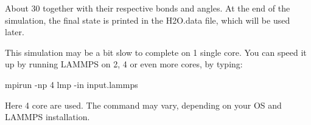 \noindent About 30 %
together with their respective bonds and angles.
At the end of the simulation, the final state is printed
in the H2O.data file, which will be used later.

\begin{tcolorbox}[colback=mylightblue!5!white,colframe=mylightblue!75!black,title=Running LAMMPS in parallel]
This simulation may be a bit slow to complete on 1 single core.
You can speed it up by running LAMMPS on 2, 4 or even more cores, by typing:
\begin{lcverbatim}
mpirun -np 4 lmp -in input.lammps
\end{lcverbatim}

\noindent Here 4 core are used. The command may vary, depending
on your OS and LAMMPS installation.
\end{tcolorbox}

